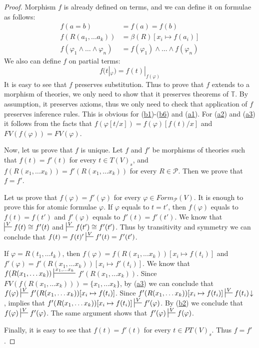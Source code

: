 \documentclass[reqno]{amsart}
\newcommand{\axref}[1]{(\hyperref[ax:#1]{#1})}
\theoremstyle{definition}
\theoremstyle{remark}
\numberwithin{figure}{section}
\begin{document}
\begin{proof}
Morphism $f$ is already defined on terms, and we can define it on formulae as follows:
\begin{align*}
f(a = b) & = f(a) = f(b) \\
f(R(a_1, \ldots a_k)) & = \beta(R)[x_i \mapsto f(a_i)] \\
f(\varphi_1 \land \ldots \land \varphi_n) & = f(\varphi_1) \land \ldots \land f(\varphi_n)
\end{align*}
We also can define $f$ on partial terms:
\[ f(t|_\varphi) = f(t)|_{f(\varphi)} \]
It is easy to see that $f$ preserves substitution.
Thus to prove that $f$ extends to a morphism of theories, we only need to show that it preserves theorems of $\mathbb{T}$.
By assumption, it preserves axioms, thus we only need to check that application of $f$ preserves inference rules.
This is obvious for \axref{b1}-\axref{b6} and \axref{a1}.
For \axref{a2} and \axref{a3} it follows from the facts that $f(\varphi[t/x]) = f(\varphi)[f(t)/x]$ and $FV(f(\varphi)) = FV(\varphi)$.

Now, let us prove that $f$ is unique.
Let $f$ and $f'$ be morphisms of theories such that $f(t) = f'(t)$ for every $t \in T(V)_s$, and
    $f(R(x_1, \ldots x_k)) = f'(R(x_1, \ldots x_k))$ for every $R \in \mathcal{P}$.
Then we prove that $f = f'$.

Let us prove that $f(\varphi) = f'(\varphi)$ for every $\varphi \in Form_\mathcal{P}(V)$.
It is enough to prove this for atomic formulae $\varphi$.
If $\varphi$ equals to $t = t'$, then $f(\varphi)$ equals to $f(t) = f(t')$ and $f'(\varphi)$ equals to $f'(t) = f'(t')$.
We know that $\sststile{}{V} f(t) \cong f'(t)$ and $\sststile{}{V} f(t') \cong f'(t')$.
Thus by transitivity and symmetry we can conclude that $f(t) = f(t)' \sststile{}{V} f'(t) = f'(t')$.

If $\varphi = R(t_1, \ldots t_k)$, then $f(\varphi) = f(R(x_1, \ldots x_k))[x_i \mapsto f(t_i)]$
    and $f'(\varphi) = f'(R(x_1, \ldots x_k))[x_i \mapsto f'(t_i)]$.
We know that $f(R(x_1, \ldots x_k)) \sststile{}{x_1, \ldots x_k}$ \linebreak $f'(R(x_1, \ldots x_k))$.
Since $FV(f(R(x_1, \ldots x_k))) = \{ x_1, \ldots x_k \}$, by \axref{a3} we can conclude that $f(\varphi) \sststile{}{V} f'(R(x_1, \ldots x_k))[x_i \mapsto f(t_i)]$.
Since $f'(R(x_1, \ldots x_k))[x_i \mapsto f(t_i)] \sststile{}{V} f(t_i)\!\downarrow$,  implies that
    $f'(R(x_1, \ldots x_k))[x_i \mapsto f(t_i)] \sststile{}{V} f'(\varphi)$.
By \axref{b2} we conclude that $f(\varphi) \sststile{}{V} f'(\varphi)$.
The same argument shows that $f'(\varphi) \sststile{}{V} f(\varphi)$.

Finally, it is easy to see that $f(t) = f'(t)$ for every $t \in PT(V)_s$.
Thus $f = f'$.
\end{proof}
\end{document}
